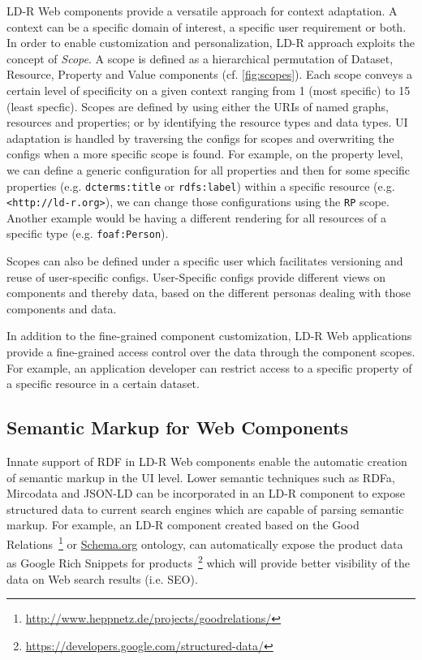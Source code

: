 \documentclass{acm_proc_article-sp}
\begin{document}
LD-R Web components provide a versatile approach for context adaptation.
A context can be a specific domain of interest, a specific user requirement or both.
In order to enable customization and personalization, LD-R approach exploits the concept of \emph{Scope}.
A scope is defined as a hierarchical permutation of Dataset, Resource, Property and Value components (cf. \autoref{fig:scopes}).
Each scope conveys a certain level of specificity on a given context ranging from 1 (most specific) to 15 (least specfic).
Scopes are defined by using either the URIs of named graphs, resources and properties; or by identifying the resource types and data types.
UI adaptation is handled by traversing the configs for scopes and overwriting the configs when a more specific scope is found.
For example, on the property level, we can define a generic configuration for all properties and then for some specific properties (e.g. \texttt{dcterms:title} or \texttt{rdfs:label}) within a specific resource (e.g. \texttt{<http://ld-r.org>}), we can change those configurations using the \texttt{RP} scope.
Another example would be having a different rendering for all resources of a specific type (e.g. \texttt{foaf:Person}).

Scopes can also be defined under a specific user which facilitates versioning and reuse of user-specific configs.
User-Specific configs provide different views on components and thereby data, based on the different personas dealing with those components and data.

In addition to the fine-grained component customization, LD-R Web applications provide a fine-grained access control over the data through the component scopes.
For example, an application developer can restrict access to a specific property of a specific resource in a certain dataset.

\subsection{Semantic Markup for Web Components}
\label{sec:markup}
Innate support of RDF in LD-R Web components enable the automatic creation of semantic markup in the UI level.
Lower semantic techniques such as RDFa, Mircodata and JSON-LD can be incorporated in an LD-R component to expose structured data to current search engines which are capable of parsing semantic markup.
For example, an LD-R component created based on the Good Relations~\footnote{\url{http://www.heppnetz.de/projects/goodrelations/}} or \url{Schema.org} ontology, can automatically expose the product data as Google Rich Snippets for products~\footnote{\url{https://developers.google.com/structured-data/}} which will provide better visibility of the data on Web search results (i.e. SEO).
\end{document}
